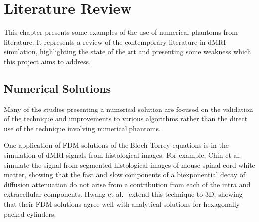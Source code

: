 \chapter{Literature Review}
\label{sec:literature_review}

\chaptertoc{}

\begin{chapterabstract}
  This chapter presents some examples of the use of numerical phantoms from literature.
  It represents a review of the contemporary literature in \ac{dMRI} simulation, highlighting the state of the art and presenting some weakness which this project aims to address. 
\end{chapterabstract}




 

\section{Numerical Solutions}
\label{sec:app_numerical_solutions}
Many of the studies presenting a numerical solution are focused on the validation of the technique and improvements to various algorithms rather than the direct use of the technique involving numerical phantoms.

One application of \ac{FDM} solutions of the Bloch-Torrey equations is in the simulation of \ac{dMRI} signals from histological images.
For example, Chin et al.\ \cite{Chin2002} simulate the signal from segmented histological images of mouse spinal cord white matter, showing that the fast and slow components of a biexponential decay of diffusion attenuation do not arise from a contribution from each of the intra and extracellular components.
Hwang et al.\ \cite{Hwang2003} extend this technique to 3D, showing that their \ac{FDM} solutions agree well with analytical solutions for hexagonally packed cylinders. 

